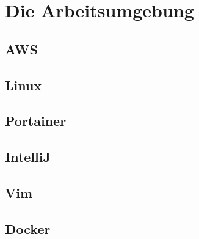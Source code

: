 \chapter{Die Arbeitsumgebung}
\section{AWS}
\section{Linux}
\section{Portainer}
\section{IntelliJ}
\section{Vim}
\section{Docker}